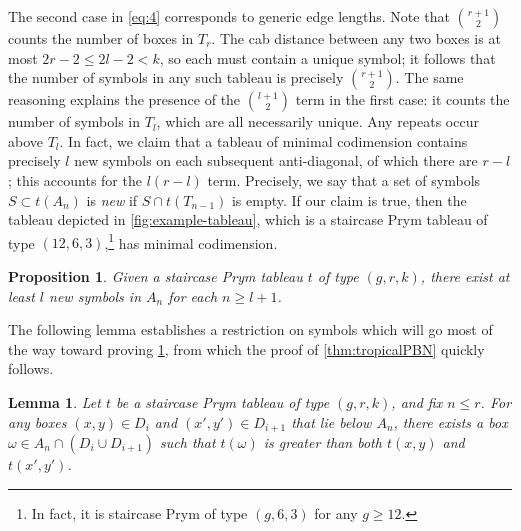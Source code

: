 \documentclass[11pt,reqno]{amsart}
\newcommand*{\restrict}[1]{{\mid}_{#1}}
\theoremstyle{definition}
\theoremstyle{problem}
\theoremstyle{plain}
\newtheorem{proposition}[definition]{Proposition}
\newtheorem{lemma}[definition]{Lemma}
\theoremstyle{remark}
\theoremstyle{theorem}
\numberwithin{equation}{section}
\numberwithin{figure}{section}
\begin{document}
The second case in \cref{eq:4} corresponds to generic edge lengths.
Note that $\binom{r+1}{2}$ counts the number of boxes in $T_r$.  The
cab distance between any two boxes is at most $2r-2 \leq 2l - 2 < k$,
so each must contain a unique symbol; it follows that the number of
symbols in any such tableau is precisely $\binom{r+1}{2}$.  The same
reasoning explains the presence of the $\binom{l+1}{2}$ term in the
first case: it counts the number of symbols in $T_l$, which are all
necessarily unique.  Any repeats occur above $T_l$.  In fact, we claim
that a tableau of minimal codimension contains precisely $l$ new
symbols on each subsequent anti-diagonal, of which there are $r-l$;
this accounts for the $l(r-l)$ term.  Precisely, we say that a set of
symbols $S \subset t(A_n)$ is \textit{new} if $S \cap t(T_{n-1})$ is
empty.  If our claim is true, then the tableau depicted in
\cref{fig:example-tableau}, which is a staircase Prym tableau of type
$(12,6,3)$,\footnote{In fact, it is staircase Prym of type $(g,6,3)$
  for any $g \geq 12$.} has minimal codimension.

\begin{proposition}
  \label{prop:1}
  Given a staircase Prym tableau $t$ of type $(g,r,k)$, there exist at
  least $l$ new symbols in $A_n$ for each $n \geq l + 1$.
\end{proposition}

\noindent The following lemma establishes a restriction on symbols
which will go most of the way toward proving \cref{prop:1}, from which
the proof of \cref{thm:tropicalPBN} quickly follows.

\begin{lemma}
  \label{lem:2}
  Let $t$ be a staircase Prym tableau of type $(g,r,k)$, and fix
  $n\leq r$.  For any boxes $(x,y) \in D_i$ and $(x',y') \in D_{i+1}$
  that lie below $A_n$, there exists a box
  $\omega \in A_n\cap(D_i\cup D_{i+1})$ such that $t(\omega)$ is
  greater than both $t(x,y)$ and $t(x',y')$.
\end{lemma}
\end{document}

